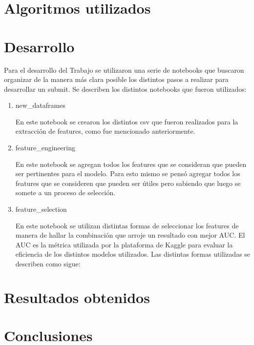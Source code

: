 \documentclass[a4paper]{article}
\begin{document}
\section{Algoritmos utilizados}

\section{Desarrollo}
Para el desarrollo del Trabajo se utilizaron una serie de notebooks que buscaron organizar de la manera más clara posible los distintos pasos a realizar para desarrollar un submit. Se describen los distintos notebooks que fueron utilizados:
\begin{enumerate} 
\item new\_dataframes 	

En este notebook se crearon los distintos csv que fueron realizados para la extracción de features, como fue mencionado anteriormente. 

\item feature\_engineering

En este notebook se agregan todos los features que se consideran que pueden ser pertinentes para el modelo. Para esto mismo se pensó agregar todos los features que se consideren que pueden ser útiles pero sabiendo que luego se somete a un proceso de selección. 

\item feature\_selection

En este notebook se utilizan distintas formas de seleccionar los features de manera de hallar la combinación que arroje un resultado con mejor AUC. El AUC es la métrica utilizada por la plataforma de Kaggle para evaluar la eficiencia de los distintos modelos utilizados. Las distintas formas utilizadas se describen como sigue:
 

\end{enumerate}

 

\section{Resultados obtenidos}

\section{Conclusiones}
\end{document}
